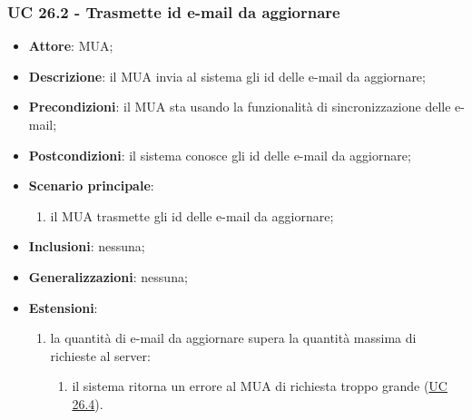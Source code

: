     \subsubsection{UC 26.2 - Trasmette id e-mail da aggiornare} \label{sec:UC26.2}
    \begin{itemize}
        \item \textbf{Attore}: MUA;
        \item \textbf{Descrizione}: il MUA invia al sistema gli id delle e-mail da aggiornare;
        \item \textbf{Precondizioni}: il MUA sta usando la funzionalità di sincronizzazione delle e-mail;
        \item \textbf{Postcondizioni}: il sistema conosce gli id delle e-mail da aggiornare;
        \item \textbf{Scenario principale}:
            \begin{enumerate}
                \item il MUA trasmette gli id delle e-mail da aggiornare;
            \end{enumerate}
        \item \textbf{Inclusioni}: nessuna;
        \item \textbf{Generalizzazioni}: nessuna;
        \item \textbf{Estensioni}:
            \begin{enumerate}[label=\alph*.]
                \item la quantità di e-mail da aggiornare supera la quantità massima di richieste al server:
                \begin{enumerate}[label=\arabic*.]
                    \item il sistema ritorna un errore al MUA di richiesta troppo grande (\hyperref[sec:UC26.4]{UC 26.4}).
                \end{enumerate}
            \end{enumerate}
    \end{itemize}


